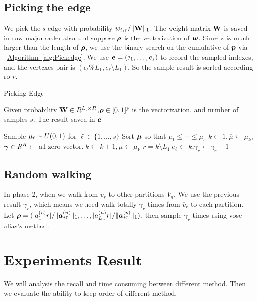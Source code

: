\documentclass[letterpaper]{article}
\newcommand{\V}[1]{{\bm{{\MakeLowercase{#1}}}}}
\newcommand{\Vacol}[1]{\V{a}^{(#1)}_{*r}}
\newcommand{\M}[1]{{\bm{\mathbf{\MakeUppercase{#1}}}}}
\newcommand{\norm}[2]{\|#1\|_{#2}}
\newcommand{\Alg}[1] {\hyperref[alg:#1] {Algorithm~\ref*{alg:#1}}}
\begin{document}
\subsection{Picking the edge}
We pick the $s$ edge with probability  $w_{i_1r}/\norm{\M{W}}{1}$. The weight matrix $\M{W}$ is saved in row major order also and suppose $\V{\rho}$ is the vectorization of $\V{W}$. Since $s$ is much larger than the length of $\V{\rho}$, we use the binary search on the cumulative of $\V{p}$ via ~\Alg{Pickedge}. We use $\V{e}=(e_1,\ldots,e_s)$ to record the sampled indexes, and the vertexes pair is $(e_{\ell}\%L_1,e_{\ell}\setminus L_1)$. So the sample result is sorted according ro $r$.

\begin{algorithm}[ht]
    \caption{Picking Edge}
    \label{alg:Pickedge}
    Given probability $\M{W}\in R^{L_1\times R}$,$\V{\rho}\in[0,1]^p$ is the vectorization, and number of samples $s$.
    The result saved in $\V{e}$
    \begin{algorithmic}[1]
    \State Sample $\mu_{\ell} \thicksim U(0,1)$ for $\ell \in \{1,\ldots,s\}$
    \State Sort $\V{\mu}$ so that $\mu_1 \leq \cdots\leq\mu_s$
    \State $k \leftarrow 1,\overline{\mu} \leftarrow \mu_k$,$\V{\gamma}\in R^R\leftarrow$ all-zero vector.
    \While {$\mu_{\ell} > \overline{\mu}$}
    \State $k \leftarrow k+1,\overline{\mu} \leftarrow \mu_k$
    \EndWhile
    \State $r = k \setminus L_1$
    \State $e_{\ell}\leftarrow k$,$\gamma_{r}\leftarrow \gamma_{r} + 1$
    \EndFor
    \end{algorithmic}
\end{algorithm}
\subsection{Random walking}

In phase 2, when we walk from $\overline{v}_r$ to other partitions $V_n$. We use the previous result $\gamma_{r}$, which means we need walk totally $\gamma_{r}$ times from $\overline{v}_r$ to each  partition. Let $\V{\rho} = (|{a}^{(n)}_{1}{r}|/\norm{\Vacol{n}}{1},\ldots,|{a}^{(n)}_{L_n}{r}|/\norm{\Vacol{n}}{1})$, then sample $\gamma_{r}$ times using vose alias's method.
\section{Experiments Result}
We will analysis the recall and time consuming  between different method. Then we evaluate the ability to keep order of different method.
\end{document}
